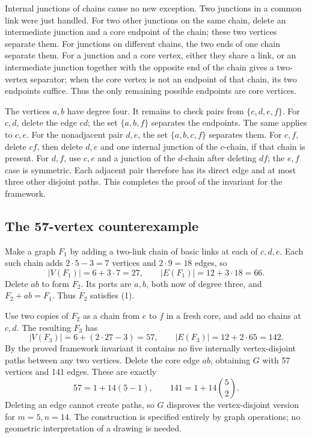 Internal junctions of chains cause no new exception. Two junctions in a common link were just handled. For two other junctions on the same chain, delete an intermediate junction and a core endpoint of the chain; these two vertices separate them. For junctions on different chains, the two ends of one chain separate them.
For a junction and a core vertex, either they share a link, or an intermediate junction together with the opposite end of the chain gives a two-vertex separator; when the core vertex is not an endpoint of that chain, its two endpoints suffice.
Thus the only remaining possible endpoints are core vertices.

The vertices \(a,b\) have degree four. It remains to check pairs from \(\{c,d,e,f\}\).
For \(c,d\), delete the edge \(cd\); the set \(\{a,b,f\}\) separates the endpoints. The same applies to \(c,e\).
For the nonadjacent pair \(d,e\), the set \(\{a,b,c,f\}\) separates them.
For \(c,f\), delete \(cf\), then delete \(d,e\) and one internal junction of the \(c\)-chain, if that chain is present.
For \(d,f\), use \(c,e\) and a junction of the \(d\)-chain after deleting \(df\); the \(e,f\) case is symmetric.
Each adjacent pair therefore has its direct edge and at most three other disjoint paths. This completes the proof of the invariant for the framework.

\subsection*{The 57-vertex counterexample}
Make a graph \(F_1\) by adding a two-link chain of basic links at each of \(c,d,e\).
Each such chain adds \(2\cdot5-3=7\) vertices and \(2\cdot9=18\) edges, so
\[
 |V(F_1)|=6+3\cdot7=27,\qquad |E(F_1)|=12+3\cdot18=66.
\]
Delete \(ab\) to form \(F_2\). Its ports are \(a,b\), both now of degree three, and
\(F_2+ab=F_1\). Thus \(F_2\) satisfies (1).

Use two copies of \(F_2\) as a chain from \(e\) to \(f\) in a fresh core, and add no chains at \(c,d\).
The resulting \(F_3\) has
\[
 |V(F_3)|=6+(2\cdot27-3)=57,\qquad
 |E(F_3)|=12+2\cdot65=142.
\]
By the proved framework invariant it contains no five internally vertex-disjoint paths between any two vertices.
Delete the core edge \(ab\), obtaining \(G\) with 57 vertices and 141 edges.
These are exactly
\[
 57=1+14(5-1),\qquad 141=1+14\binom52.
\]
Deleting an edge cannot create paths, so \(G\) disproves the vertex-disjoint version for \(m=5,n=14\).
The construction is specified entirely by graph operations; no geometric interpretation of a drawing is needed.

